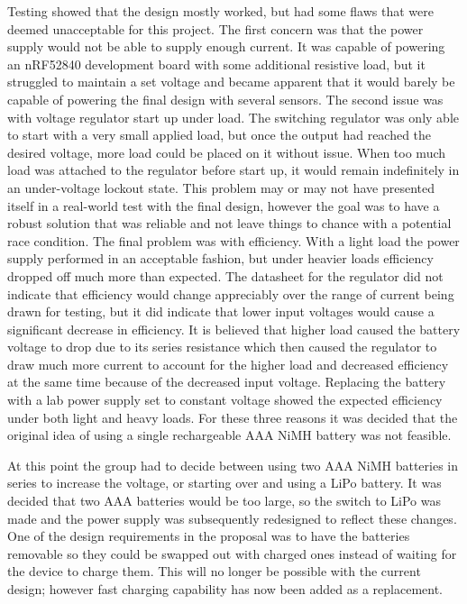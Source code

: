 Testing showed that the design mostly worked, but had some flaws that were 
deemed unacceptable for this project. The first concern was that the power 
supply would not be able to supply enough current. It was capable of powering 
an nRF52840 development board with some additional resistive load, but it 
struggled to maintain a set voltage and became apparent that it would 
barely be capable of powering the final design with several sensors. The second 
issue was with voltage regulator start up under load. The switching regulator 
was only able to start with a very small applied load, but once the output had 
reached the desired voltage, more load could be placed on it without issue. When 
too much load was attached to the regulator before start up, it would remain indefinitely in an
under-voltage lockout state. This problem may or may not have 
presented itself in a real-world test with the final design, however the goal 
was to have a robust solution that was reliable and not leave things to chance 
with a potential race condition. The final problem was with efficiency. With a light 
load the power supply performed in an acceptable fashion, but under heavier 
loads efficiency dropped off much more than expected. The datasheet for the 
regulator did not indicate that efficiency would change appreciably over the 
range of current being drawn for testing, but it did indicate that lower input 
voltages would cause a significant decrease in efficiency. It is believed that 
higher load caused the battery voltage to drop due to its series resistance 
which then caused the regulator to draw much more current to account for the 
higher load and decreased efficiency at the same time because of the decreased 
input voltage. Replacing the battery with a lab power supply set to constant 
voltage showed the expected efficiency under both light and heavy loads. For 
these three reasons it was decided that the original idea of using a single 
rechargeable AAA NiMH battery was not feasible. 

At this point the group had to decide between using two AAA NiMH batteries in 
series to increase the voltage, or starting over and using a LiPo battery. It 
was decided that two AAA batteries would be too large, so the switch to LiPo 
was made and the power supply was subsequently redesigned to reflect these 
changes. One of the design requirements in the proposal was to have the 
batteries removable so they could be swapped out with charged ones instead of 
waiting for the device to charge them. This will no longer be possible with 
the current design; however fast charging capability has now been added as a 
replacement.

